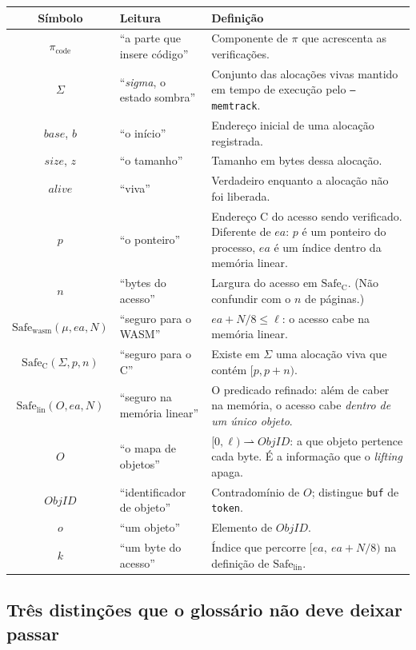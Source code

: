 \documentclass[11pt,a4paper]{article}
\theoremstyle{definition}
\newcommand{\Safe}{\mathrm{Safe}}
\newcommand{\wasm}{\mathrm{wasm}}
\newcommand{\lin}{\mathrm{lin}}
\newcommand{\code}[1]{\texttt{#1}}
\begin{document}
\begin{tabularx}{\textwidth}{@{}c l X@{}}
\toprule
\textbf{Símbolo} & \textbf{Leitura} & \textbf{Definição} \\
\midrule
$\pi_{\text{code}}$ & ``a parte que insere código'' & Componente de $\pi$ que acrescenta as verificações. \\
$\Sigma$ & ``\emph{sigma}, o estado sombra'' & Conjunto das alocações vivas mantido em tempo de execução pelo \code{--memtrack}. \\
$\mathit{base}$, $b$ & ``o início'' & Endereço inicial de uma alocação registrada. \\
$\mathit{size}$, $z$ & ``o tamanho'' & Tamanho em bytes dessa alocação. \\
$\mathit{alive}$ & ``viva'' & Verdadeiro enquanto a alocação não foi liberada. \\
$p$ & ``o ponteiro'' & Endereço C do acesso sendo verificado. Diferente de $ea$: $p$ é um ponteiro do processo, $ea$ é um índice dentro da memória linear. \\
$n$ & ``bytes do acesso'' & Largura do acesso em $\Safe_{\mathrm{C}}$. (Não confundir com o $n$ de páginas.) \\
$\Safe_{\wasm}(\mu, ea, N)$ & ``seguro para o WASM'' & $ea + N/8 \le \ell$: o acesso cabe na memória linear. \\
$\Safe_{\mathrm{C}}(\Sigma, p, n)$ & ``seguro para o C'' & Existe em $\Sigma$ uma alocação viva que contém $[p, p+n)$. \\
$\Safe_{\lin}(O, ea, N)$ & ``seguro na memória linear'' & O predicado refinado: além de caber na memória, o acesso cabe \emph{dentro de um único objeto}. \\
$O$ & ``o mapa de objetos'' & $[0,\ell) \rightharpoonup \mathit{ObjID}$: a que objeto pertence cada byte. É a informação que o \emph{lifting} apaga. \\
$\mathit{ObjID}$ & ``identificador de objeto'' & Contradomínio de $O$; distingue \code{buf} de \code{token}. \\
$o$ & ``um objeto'' & Elemento de $\mathit{ObjID}$. \\
$k$ & ``um byte do acesso'' & Índice que percorre $[ea,\ ea + N/8)$ na definição de $\Safe_{\lin}$. \\
\bottomrule
\end{tabularx}

\subsection{Três distinções que o glossário não deve deixar passar}
\end{document}
